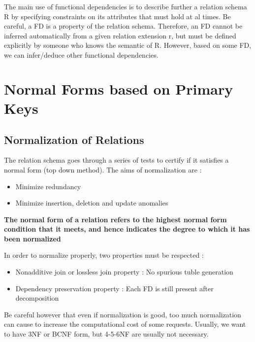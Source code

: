 The main use of functional dependencies is to describe further a relation schema R by specifying constraints on its attributes that must hold at al times. Be careful, a FD is a property of the relation schema. Therefore, an FD cannot be inferred automatically from a given relation extension r, but must be defined explicitly by someone who knows the semantic of R. However, based on some FD, we can infer/deduce other functional dependencies.

\section{Normal Forms based on Primary Keys}
\subsection{Normalization of Relations}
The relation schema goes through a series of tests to certify if it satisfies a normal form (top down method). The aims of normalization are :
\begin{itemize}
  \item Minimize redundancy
  \item Minimize insertion, deletion and update anomalies
\end{itemize}

\begin{center}
\textbf{The normal form of a relation refers to the highest normal form
condition that it meets, and hence indicates the degree to which it has been
normalized}
\end{center}

In order to normalize properly, two properties must be respected :
\begin{itemize}
  \item Nonadditive join or lossless join property : No spurious tuble generation
  \item Dependency preservation property : Each FD is still present after decomposition\\
\end{itemize}

Be careful however that even if normalization is good, too much normalization can cause to increase the computational cost of some requests. Usually, we want to have 3NF or BCNF form, but 4-5-6NF are usually not necessary.

